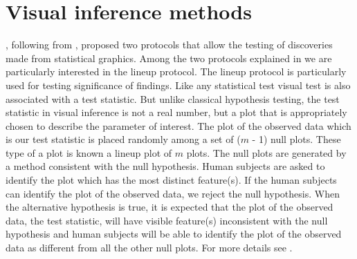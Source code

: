 \documentclass[12]{article}
\begin{document}
%
%
%
%
%
%

\section{Visual inference methods} \label{sec:inference}

\cite{buja:2009}, following from \cite{gelman:2004}, proposed two protocols that allow the testing of discoveries made from statistical graphics. Among the two protocols explained in \cite{buja:2009} we are particularly interested in the lineup protocol. The lineup protocol is particularly used for testing significance of findings. Like any statistical test visual test is also associated with a test statistic. But unlike classical hypothesis testing, the test statistic in visual inference is not a real number, but a plot that is appropriately chosen to describe the parameter of interest. The plot of the observed data which is our test statistic is placed randomly among a set of ($m$ - 1) null plots. These type of a plot is known a lineup plot of $m$ plots. The null plots are generated by a method consistent with the null hypothesis. Human subjects are asked to identify the plot which has the most distinct feature(s). If the human subjects can identify the plot of the observed data, we reject the null hypothesis. When the alternative hypothesis is true, it is expected that the plot of the observed data, the test statistic, will have visible feature(s) inconsistent with the null hypothesis and human subjects will be able to identify the plot of the observed data as different from all the other null plots. For more details see \cite{buja:2009}. 
\end{document}
